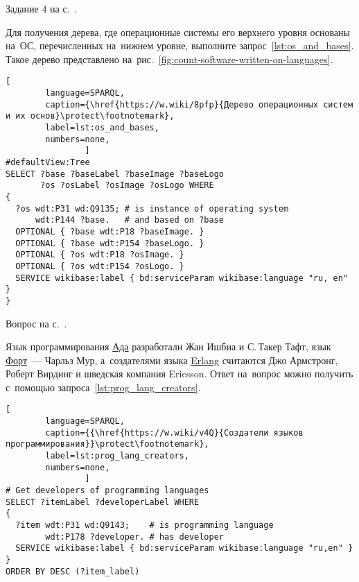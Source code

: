 \newpage
\begin{task}
\label{answer:os_and_bases}
    \AnswerBackref Задание 4 на с.~\pageref{tasks:operating_system_tasks}.

    Для получения дерева, где операционные системы его верхнего уровня  
    основаны на~ОС, перечисленных на~нижнем уровне, выполните запрос~\ref{lst:os_and_bases}. 
    Такое дерево представлено на~рис.~\ref{fig:count-software-written-on-languages}.

\begin{lstlisting}[ 
        language=SPARQL, 
        caption={\href{https://w.wiki/8pfp}{Дерево операционных систем и их основ}\protect\footnotemark},
        label=lst:os_and_bases,
        numbers=none,
	            ]
#defaultView:Tree
SELECT ?base ?baseLabel ?baseImage ?baseLogo
       ?os ?osLabel ?osImage ?osLogo WHERE 
{
  ?os wdt:P31 wd:Q9135; # is instance of operating system
      wdt:P144 ?base.   # and based on ?base
  OPTIONAL { ?base wdt:P18 ?baseImage. }
  OPTIONAL { ?base wdt:P154 ?baseLogo. }
  OPTIONAL { ?os wdt:P18 ?osImage. }
  OPTIONAL { ?os wdt:P154 ?osLogo. }
  SERVICE wikibase:label { bd:serviceParam wikibase:language "ru, en" }
}
\end{lstlisting}
\end{task}




\hfil{}\hfil%

\begin{task}
    \label{answer:prog_lang_1}
    \AnswerBackref Вопрос на с.~\pageref{question:prog_lang_1}.

    Язык программирования \href{https://ru.wikipedia.org/?curid=4500}{Ада} 
    разработали Жан Ишбиа и С.\,Такер Тафт, 
    язык \href{https://ru.wikipedia.org/?curid=11379}{Форт}~--- Чарльз Мур, 
    а~создателями языка \href{https://ru.wikipedia.org/wiki/Erlang}{Erlang} 
    считаются Джо Армстронг, Роберт Вирдинг 
    и шведская компания Ericsson. 
    Ответ на~вопрос можно получить с~помощью запроса~\ref{lst:prog_lang_creators}. 

\begin{lstlisting}[
        language=SPARQL, 
        caption={{\href{https://w.wiki/v4Q}{Создатели языков программирования}}\protect\footnotemark}, 
        label=lst:prog_lang_creators,
        numbers=none,
                ]
# Get developers of programming languages
SELECT ?itemLabel ?developerLabel WHERE 
{
  ?item wdt:P31 wd:Q9143;    # is programming language
        wdt:P178 ?developer. # has developer
  SERVICE wikibase:label { bd:serviceParam wikibase:language "ru,en" }
}
ORDER BY DESC (?item_label)
\end{lstlisting}
\end{task}



